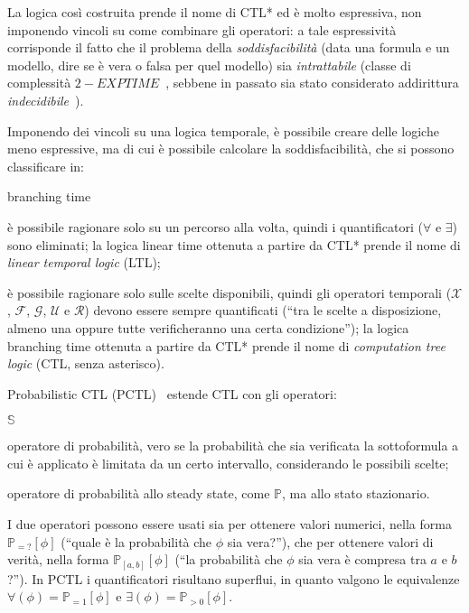 	La logica cos\`i costruita prende il nome di CTL* ed \`e molto espressiva, non imponendo vincoli su come combinare gli operatori: a tale espressivit\`a corrisponde il fatto che il problema della \emph{soddisfacibilit\`a} (data una formula e un modello, dire se \`e vera o falsa per quel modello) sia \emph{intrattabile} (classe di complessit\`a $2-EXPTIME$~\cite{visser2000practical}, sebbene in passato sia stato considerato addirittura \emph{indecidibile}~\cite{emerson1988complexity}).
	
	Imponendo dei vincoli su una logica temporale, \`e possibile creare delle logiche meno espressive, ma di cui \`e possibile calcolare la soddisfacibilit\`a, che si possono classificare in:
	\begin{labeling}{branching time}
		\item [linear time] \`e possibile ragionare solo su un percorso alla volta, quindi i quantificatori ($\forall$ e $\exists$) sono eliminati; la logica linear time ottenuta a partire da CTL* prende il nome di \emph{linear temporal logic} (LTL);
		\item [branching time] \`e possibile ragionare solo sulle scelte disponibili, quindi gli operatori temporali ($\mathcal{X}$, $\mathcal{F}$, $\mathcal{G}$, $\mathcal{U}$ e $\mathcal{R}$) devono essere sempre quantificati (``tra le scelte a disposizione, almeno una oppure tutte verificheranno una certa condizione''); la logica branching time ottenuta a partire da CTL* prende il nome di \emph{computation tree logic} (CTL, senza asterisco).
	\end{labeling}
	
	Probabilistic CTL (PCTL)~\cite{hansson1994logic} estende CTL con gli operatori:
	\begin{labeling}{$\mathbb{S}$}
		\item [$\mathbb{P}$] operatore di probabilit\`a, vero se la probabilit\`a che sia verificata la sottoformula a cui \`e applicato \`e limitata da un certo intervallo, considerando le possibili scelte;
		\item [$\mathbb{S}$] operatore di probabilit\`a allo steady state, come $\mathbb{P}$, ma allo stato stazionario.
	\end{labeling}
	
	I due operatori possono essere usati sia per ottenere valori numerici, nella forma $\mathbb{P}_{=?} [\phi]$ (``quale \`e la probabilit\`a che $\phi$ sia vera?''), che per ottenere valori di verit\`a, nella forma $\mathbb{P}_{[a,b]} [\phi]$ (``la probabilit\`a che $\phi$ sia vera \`e compresa tra $a$ e $b$?'').
	In PCTL i quantificatori risultano superflui, in quanto valgono le equivalenze $\forall(\phi) = \mathbb{P}_{=1}[\phi]$ e $\exists(\phi) = \mathbb{P}_{>0}[\phi]$.
	
